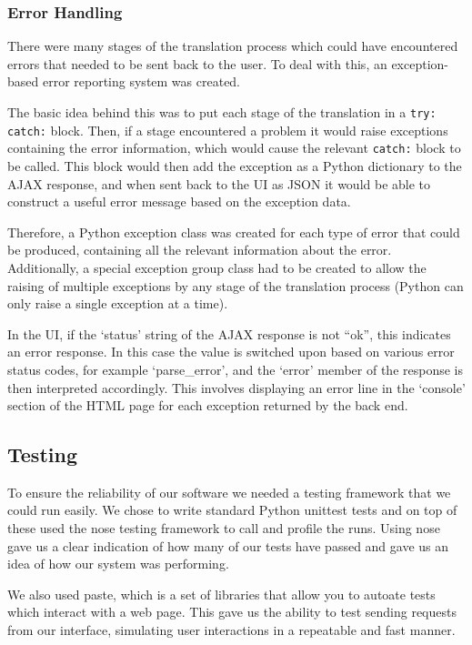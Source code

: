 \documentclass[a4paper, 11pt]{article}
\begin{document}
    \subsubsection{Error Handling}
      There were many stages of the translation process which could have
      encountered errors that needed to be sent back to the user. To deal with
      this, an exception-based error reporting system was created.

      The basic idea behind this was to put each stage of the translation in a
      \texttt{try: catch:} block. Then, if a stage encountered a problem it
      would raise exceptions containing the error information, which would cause
      the relevant \texttt{catch:} block to be called. This block would then add
      the exception as a Python dictionary to the AJAX response, and when sent
      back to the UI as JSON it would be able to construct a useful error
      message based on the exception data.

      Therefore, a Python exception class was created for each type of error
      that could be produced, containing all the relevant information about the
      error. Additionally, a special exception group class had to be created to
      allow the raising of multiple exceptions by any stage of the translation
      process (Python can only raise a single exception at a time).

      In the UI, if the `status' string of the AJAX response is not ``ok'', this
      indicates an error response. In this case the value is switched upon based
      on various error status codes, for example `parse\_error', and the `error'
      member of the response is then interpreted accordingly. This involves
      displaying an error line in the `console' section of the HTML page for
      each exception returned by the back end.

  \subsection{Testing}
  To ensure the reliability of our software we needed a testing framework that
  we could run easily. We chose to write standard Python unittest tests and on
  top of these used the nose testing framework to call and profile the runs.
  Using nose gave us a clear indication of how many of our tests have passed
  and gave us an idea of how our system was performing.

  We also used paste, which is a set of libraries that allow you to autoate
  tests which interact with a web page. This gave us the ability to test
  sending requests from our interface, simulating user interactions in a
  repeatable and fast manner.
\end{document}
